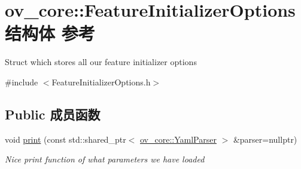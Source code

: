 \hypertarget{structov__core_1_1FeatureInitializerOptions}{}\section{ov\+\_\+core\+:\+:Feature\+Initializer\+Options结构体 参考}
\label{structov__core_1_1FeatureInitializerOptions}


Struct which stores all our feature initializer options  




{\ttfamily \#include $<$Feature\+Initializer\+Options.\+h$>$}

\subsection*{Public 成员函数}
\begin{DoxyCompactItemize}
\item 
\mbox{\label{structov__core_1_1FeatureInitializerOptions_ac4daa94e8d53f30a8b12bfb8261004c4}} 
void \hyperlink{structov__core_1_1FeatureInitializerOptions_ac4daa94e8d53f30a8b12bfb8261004c4}{print} (const std\+::shared\+\_\+ptr$<$ \hyperlink{classov__core_1_1YamlParser}{ov\+\_\+core\+::\+Yaml\+Parser} $>$ \&parser=nullptr)
\begin{DoxyCompactList}\small\item\em Nice print function of what parameters we have loaded \end{DoxyCompactList}\end{DoxyCompactItemize}
